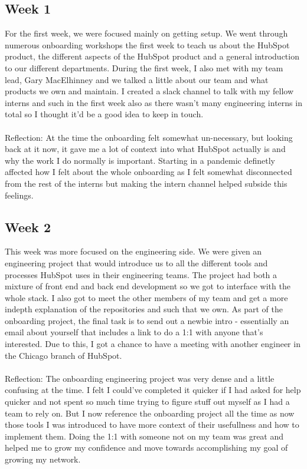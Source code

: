 \documentclass[12pt]{article} %
\begin{document}
\subsection{Week 1}
For the first week, we were focused mainly on getting setup. We went through numerous onboarding workshops the first week to teach us about the HubSpot product, the different aspects of the HubSpot product and a general introduction to our different departments. During the first week, I also met with my team lead, Gary MacElhinney and we talked a little about our team and what products we own and maintain. I created a slack channel to talk with my fellow interns and such in the first week also as there wasn't many engineering interns in total so I thought it'd be a good idea to keep in touch. 
\\\\ 
Reflection: At the time the onboarding felt somewhat un-necessary, but looking back at it now, it gave me a lot of context into what HubSpot actually is and why the work I do normally is important. Starting in a pandemic definetly affected how I felt about the whole onboarding as I felt somewhat disconnected from the rest of the interns but making the intern channel helped subside this feelings. 
\subsection{Week 2}
This week was more focused on the engineering side. We were given an engineering project that would introduce us to all the different tools and processes HubSpot uses in their engineering teams. The project had both a mixture of front end and back end development so we got to interface with the whole stack. I also got to meet the other members of my team and get a more indepth explanation of the repositories and such that we own. As part of the onboarding project, the final task is to send out a newbie intro - essentially an email about yourself that includes a link to do a 1:1 with anyone that's interested. Due to this, I got a chance to have a meeting with another engineer in the Chicago branch of HubSpot. 
\\\\
Reflection: The onboarding engineering project was very dense and a little confusing at the time. I felt I could've completed it quicker if I had asked for help quicker and not spent so much time trying to figure stuff out myself as I had a team to rely on. But I now reference the onboarding project all the time as now those tools I was introduced to have more context of their usefullness and how to implement them. Doing the 1:1 with someone not on my team was great and helped me to grow my confidence and move towards accomplishing my goal of growing my network.
\end{document}
